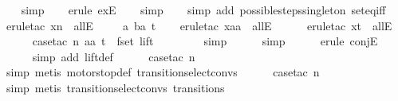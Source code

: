 \begin{isabellebody}
\ \ \isamarkupfalse%
\ simp\isanewline
\ \ \isamarkupfalse%
\ {\isacharparenleft}erule\ exE{\isacharparenright}\isanewline
\ \ \isamarkupfalse%
\ simp\isanewline
\ \ \isamarkupfalse%
\ {\isacharparenleft}simp\ add{\isacharcolon}\ possible{\isacharunderscore}steps{\isacharunderscore}singleton\ set{\isacharunderscore}eq{\isacharunderscore}iff{\isacharparenright}\isanewline
\ \ \isamarkupfalse%
\ {\isacharparenleft}erule{\isacharunderscore}tac\ x{\isacharequal}n\ \ allE{\isacharparenright}\isanewline
\ \ \isamarkupfalse%
\ \ a\ ba\ t\isanewline
\ \ \isamarkupfalse%
\ {\isacharparenleft}erule{\isacharunderscore}tac\ x{\isacharequal}aa\ \ allE{\isacharparenright}\isanewline
\ \ \ \ \isamarkupfalse%
\ {\isacharparenleft}erule{\isacharunderscore}tac\ x{\isacharequal}t\ \ allE{\isacharparenright}\isanewline
\ \ \ \ \isamarkupfalse%
\ {\isacharparenleft}case{\isacharunderscore}tac\ {\isachardoublequoteopen}{\isacharparenleft}{\isacharparenleft}n{\isacharcomma}\ aa{\isacharparenright}{\isacharcomma}\ t{\isacharparenright}\ {\isasymin}\ fset\ lift{\isachardoublequoteclose}{\isacharparenright}\isanewline
\ \ \ \ \ \isamarkupfalse%
\ \isamarkupfalse%
\ simp\isanewline
\ \ \ \ \isamarkupfalse%
\ simp\isanewline
\ \ \ \ \isamarkupfalse%
\ {\isacharparenleft}erule\ conjE{\isacharparenright}{\isacharplus}\isanewline
\ \ \ \ \isamarkupfalse%
\ {\isacharparenleft}simp\ add{\isacharcolon}\ lift{\isacharunderscore}def{\isacharparenright}\isanewline
\ \ \ \ \isamarkupfalse%
\ {\isacharparenleft}case{\isacharunderscore}tac\ {\isachardoublequoteopen}n{\isacharequal}{}{\isachardoublequoteclose}{\isacharparenright}\isanewline
\ \ \ \ \ \isamarkupfalse%
\ {\isacharparenleft}simp{\isacharcomma}\ metis\ motorstop{}{\isacharunderscore}def\ transition{\isachardot}select{\isacharunderscore}convs{\isacharparenleft}{}{\isacharparenright}{\isacharparenright}\isanewline
\ \ \ \ \isamarkupfalse%
\ {\isacharparenleft}case{\isacharunderscore}tac\ {\isachardoublequoteopen}n{\isacharequal}{}{\isachardoublequoteclose}{\isacharparenright}\isanewline
\ \ \ \ \ \isamarkupfalse%
\ {\isacharparenleft}simp{\isacharcomma}\ metis\ transition{\isachardot}select{\isacharunderscore}convs{\isacharparenleft}{}{\isacharparenright}\ transitions{\isacharparenleft}{}{\isacharparenright}{\isacharparenright}\isanewline

\end{isabellebody}
